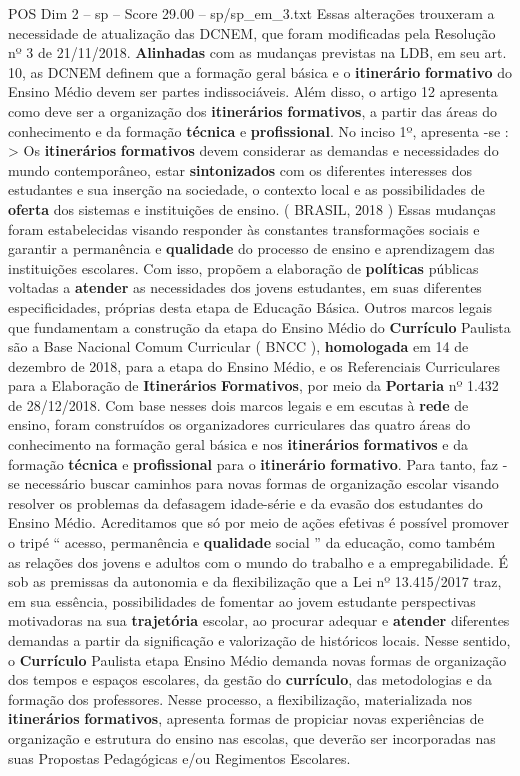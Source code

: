 \begin{textsample}{POS Dim 2 – sp – Score 29.00 – sp/sp\_em\_3.txt}
Essas alterações trouxeram a necessidade de atualização das DCNEM, que foram modificadas pela Resolução nº 3 de 21/11/2018. \textbf{Alinhadas} com as mudanças previstas na LDB, em seu art. 10, as DCNEM definem que a formação geral básica e o \textbf{itinerário} \textbf{formativo} do Ensino Médio devem ser partes indissociáveis.
Além disso, o artigo 12 apresenta como deve ser a organização dos \textbf{itinerários} \textbf{formativos}, a partir das áreas do conhecimento e da formação \textbf{técnica} e \textbf{profissional}.
No inciso 1º, apresenta -se : > Os \textbf{itinerários} \textbf{formativos} devem considerar as demandas e necessidades do mundo contemporâneo, estar \textbf{sintonizados} com os diferentes interesses dos estudantes e sua inserção na sociedade, o contexto local e as possibilidades de \textbf{oferta} dos sistemas e instituições de ensino. ( BRASIL, 2018 ) Essas mudanças foram estabelecidas visando responder às constantes transformações sociais e garantir a permanência e \textbf{qualidade} do processo de ensino e aprendizagem das instituições escolares.
Com isso, propõem a elaboração de \textbf{políticas} públicas voltadas a \textbf{atender} as necessidades dos jovens estudantes, em suas diferentes especificidades, próprias desta etapa de Educação Básica.
Outros marcos legais que fundamentam a construção da etapa do Ensino Médio do \textbf{Currículo} Paulista são a Base Nacional Comum Curricular ( BNCC ), \textbf{homologada} em 14 de dezembro de 2018, para a etapa do Ensino Médio, e os Referenciais Curriculares para a Elaboração de \textbf{Itinerários} \textbf{Formativos}, por meio da \textbf{Portaria} nº 1.432 de 28/12/2018.
Com base nesses dois marcos legais e em escutas à \textbf{rede} de ensino, foram construídos os organizadores curriculares das quatro áreas do conhecimento na formação geral básica e nos \textbf{itinerários} \textbf{formativos} e da formação \textbf{técnica} e \textbf{profissional} para o \textbf{itinerário} \textbf{formativo}.
Para tanto, faz -se necessário buscar caminhos para novas formas de organização escolar visando resolver os problemas da defasagem idade-série e da evasão dos estudantes do Ensino Médio.
Acreditamos que só por meio de ações efetivas é possível promover o tripé “ acesso, permanência e \textbf{qualidade} social ” da educação, como também as relações dos jovens e adultos com o mundo do trabalho e a empregabilidade.
É sob as premissas da autonomia e da flexibilização que a Lei nº 13.415/2017 traz, em sua essência, possibilidades de fomentar ao jovem estudante perspectivas motivadoras na sua \textbf{trajetória} escolar, ao procurar adequar e \textbf{atender} diferentes demandas a partir da significação e valorização de históricos locais.
Nesse sentido, o \textbf{Currículo} Paulista etapa Ensino Médio demanda novas formas de organização dos tempos e espaços escolares, da gestão do \textbf{currículo}, das metodologias e da formação dos professores.
Nesse processo, a flexibilização, materializada nos \textbf{itinerários} \textbf{formativos}, apresenta formas de propiciar novas experiências de organização e estrutura do ensino nas escolas, que deverão ser incorporadas nas suas Propostas Pedagógicas e/ou Regimentos Escolares.


\end{textsample}
